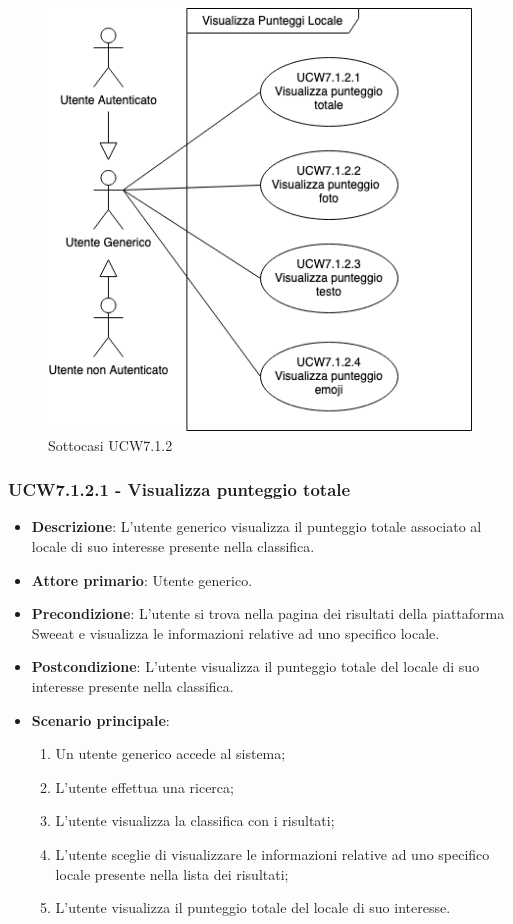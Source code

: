 \begin{figure}[H]
    \centering
        \includegraphics[scale=0.5]{UC_images/UCW7-1-2-x.png}
        \caption{Sottocasi UCW7.1.2}
\end{figure}

\subsubsection{UCW7.1.2.1 - Visualizza punteggio totale}
\begin{itemize}
	\item \textbf{Descrizione}: L'utente generico visualizza il punteggio totale associato al locale di suo interesse presente nella classifica.
    \item \textbf{Attore primario}: Utente generico.
    \item \textbf{Precondizione}: L’utente si trova nella pagina dei risultati della piattaforma Sweeat e visualizza le informazioni relative ad uno specifico locale.
    \item \textbf{Postcondizione}: L’utente visualizza il punteggio totale del locale di suo interesse presente nella classifica.
    \item \textbf{Scenario principale}: 
    \begin{enumerate}
        \item Un utente generico accede al sistema;
        \item L’utente effettua una ricerca;
        \item L'utente visualizza la classifica con i risultati;
        \item L'utente sceglie di visualizzare le informazioni relative ad uno specifico locale presente nella lista dei risultati;
        \item L'utente visualizza il punteggio totale del locale di suo interesse.
    \end{enumerate}
\end{itemize}

